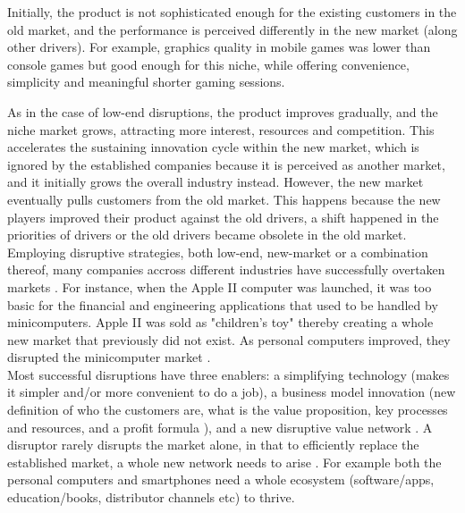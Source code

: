 \documentclass[a4paper,10pt]{article}
\begin{document}
Initially, the product is not sophisticated enough for the existing customers in the old market, 
and the performance is perceived differently in the new market (along other drivers). 
For example, graphics quality in mobile games was lower than console games but good enough for this niche, while offering convenience, simplicity and meaningful shorter
gaming sessions.

As in the case of low-end disruptions, the product improves gradually, and the niche market grows, attracting more interest, resources and competition.
This accelerates the sustaining innovation cycle within the new market, which is ignored by the established companies because it is 
perceived as another market, and it initially grows the overall industry instead.
However, the new market eventually pulls customers from the old market. This happens because the new players improved their 
product against the old drivers, a shift happened in the priorities of drivers or the old drivers became obsolete in the old market.\\


Employing disruptive strategies, both low-end, new-market or a combination thereof, many companies accross different industries 
have successfully overtaken markets \cite{innovatorsSolution}. For instance, when the Apple II computer was launched, it was too basic 
for the financial and engineering applications that used to be handled by minicomputers. Apple II was sold as "children's toy" thereby 
creating a whole new market that previously did not exist. 
As personal computers improved, they disrupted the minicomputer market \cite{disruptionInEducation}. 
\\

Most successful disruptions have three enablers: 
a simplifying technology (makes it simpler and/or more convenient to do a job), a business model innovation (new definition of who the customers are, 
what is the value proposition, key processes and resources, and a profit formula \cite{reinvetingBusinessModel}), and a new disruptive 
value network \cite{pressArticleHbsReviveHealthCareInnovation}. 
A disruptor rarely disrupts the market alone, in that to efficiently replace 
the established market, a whole new network needs to arise \cite{DisruptingClassExpandedEdition}\cite{pressArticleHbsReviveHealthCareInnovation}. 
For example both the personal computers and smartphones need a whole ecosystem (software/apps, education/books, distributor channels etc) to thrive.
\\
\end{document}
